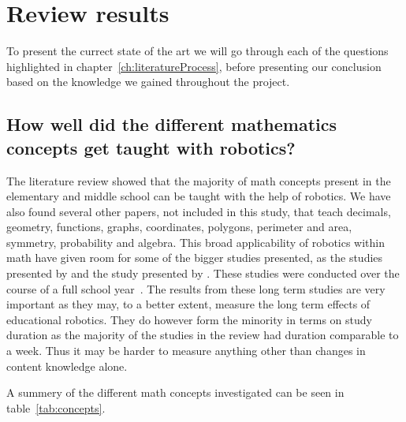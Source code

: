 \section{Review results}\label{ch:stateOfArt}
To present the currect state of the art we will go through each of the questions highlighted in chapter~\ref{ch:literatureProcess}, before presenting our conclusion based on the knowledge we gained throughout the project.

\subsection*{How well did the different mathematics concepts get taught with robotics?}
The literature review showed that the majority of math concepts present in the elementary and middle school can be taught with the help of robotics. We have also found several other papers, not included in this study, that teach decimals, geometry, functions, graphs, coordinates, polygons, perimeter and area, symmetry, probability and algebra.
This broad applicability of robotics within math have given room for some of the bigger studies presented, as the studies presented by \citeauthor{hussain2006effect} and the study presented by \citeauthor{lindh2007does}. These studies were conducted over the course of a full school year~\cite{hussain2006effect,lindh2007does}. 
The results from these long term studies are very important as they may, to a better extent, measure the long term effects of educational robotics. 
They do however form the minority in terms on study duration as the majority of the studies in the review had duration comparable to a week. 
Thus it may be harder to measure anything other than changes in content knowledge alone.

\bigskip\noindent
A summery of the different math concepts investigated can be seen in table~\ref{tab:concepts}. 

